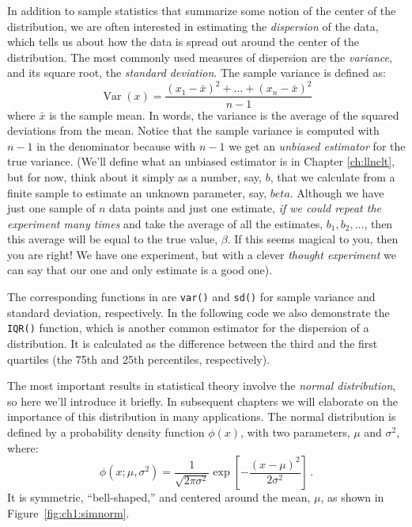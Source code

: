 In addition to sample statistics that summarize some notion of the center of
the distribution, we are often interested in estimating the \emph{dispersion} of the
data, which tells us about how the data is spread out around the center of the distribution.
The most commonly used measures of dispersion are the \emph{variance}, and its
square root, the \emph{standard deviation}. The sample variance is defined as:
$$\operatorname{Var}(x)=\frac{(x_1-\bar{x})^2+\ldots+(x_n-\bar{x})^2}{n-1}$$
where $\bar{x}$ is the sample mean.
In words, the variance is the average of the squared deviations from the mean.
Notice that the sample variance is computed with $n-1$ in the denominator
because with $n-1$ we get an \emph{unbiased estimator} for the true variance.
(We'll define what an unbiased estimator is in Chapter \ref{ch:llnclt},
but for now, think about it simply as a number, say, $b$, that we calculate from 
a finite sample to estimate an unknown parameter, say, $beta$. Although we have
just one sample of $n$ data points and just one estimate, \emph{if we could
repeat the experiment many times} and take the average of all the estimates,
$b_1, b_2,\ldots$, then this average will be equal to the true value, $\beta$.
If this seems magical to you, then you are right! We have one experiment,
but with a clever \emph{thought experiment} we can say that our one and only
estimate is a good one).


The corresponding functions in \R are \lstinline{var()} and \lstinline{sd()} for sample
variance and standard deviation, respectively. In the following code we also
demonstrate the \lstinline{IQR()} function, which is another common estimator for
the dispersion of a distribution. It is calculated as the difference between the third
and the first quartiles (the 75th and 25th percentiles, respectively).


The most important results in statistical theory involve the \emph{normal distribution},
so here we'll introduce it briefly.
In subsequent chapters we will elaborate on the importance of this distribution in
many applications. The normal distribution is defined by a probability density
function $\phi(x)$, with two parameters, $\mu$ and $\sigma^2$, where:
$$\phi(x; \mu,\sigma^2)=\frac{1}{\sqrt{2\pi\sigma^2}}\exp\left[-\frac{(x-\mu)^2}{2\sigma^2}\right]\,.$$
It is symmetric, ``bell-shaped,'' and centered around the mean, $\mu$, as shown in
Figure~\ref{fig:ch1:simnorm}. 


